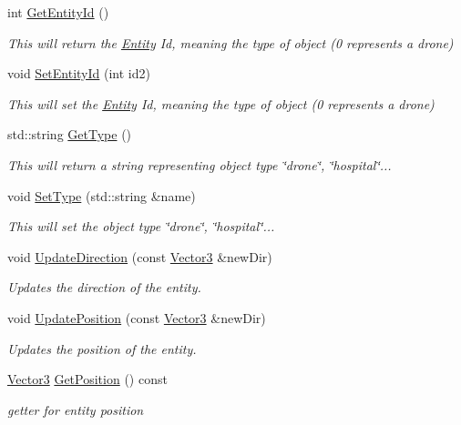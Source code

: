 \begin{DoxyCompactItemize}
int \hyperlink{classEntity_afd77b9faebc188849705d91c239d193c}{Get\+Entity\+Id} ()
\begin{DoxyCompactList}\small\item\em This will return the \hyperlink{classEntity}{Entity} Id, meaning the type of object (0 represents a drone) \end{DoxyCompactList}\item 
void \hyperlink{classEntity_a2cc57041bbb23a4acdf1b2afe1756ac7}{Set\+Entity\+Id} (int id2)
\begin{DoxyCompactList}\small\item\em This will set the \hyperlink{classEntity}{Entity} Id, meaning the type of object (0 represents a drone) \end{DoxyCompactList}\item 
std\+::string \hyperlink{classEntity_a05d8f23908e47ad19e762754461c62e6}{Get\+Type} ()
\begin{DoxyCompactList}\small\item\em This will return a string representing object type \char`\"{}drone\char`\"{}, \char`\"{}hospital\char`\"{}... \end{DoxyCompactList}\item 
void \hyperlink{classEntity_a8d956360ddbff29834d22855a785fe6c}{Set\+Type} (std\+::string \&name)
\begin{DoxyCompactList}\small\item\em This will set the object type \char`\"{}drone\char`\"{}, \char`\"{}hospital\char`\"{}... \end{DoxyCompactList}\item 
void \hyperlink{classEntity_a6ae8474b6eb3684f3977dcb5406a3d11}{Update\+Direction} (const \hyperlink{classVector3}{Vector3} \&new\+Dir)
\begin{DoxyCompactList}\small\item\em Updates the direction of the entity. \end{DoxyCompactList}\item 
void \hyperlink{classEntity_ab58e8c31ba272bdd1e945130af43493f}{Update\+Position} (const \hyperlink{classVector3}{Vector3} \&new\+Dir)
\begin{DoxyCompactList}\small\item\em Updates the position of the entity. \end{DoxyCompactList}\item 
\hyperlink{classVector3}{Vector3} \hyperlink{classEntity_ac6916016f6b9b4b4d18fd988a373fddb}{Get\+Position} () const
\begin{DoxyCompactList}\small\item\em getter for entity position \end{DoxyCompactList}\item 

\end{DoxyCompactItemize}
